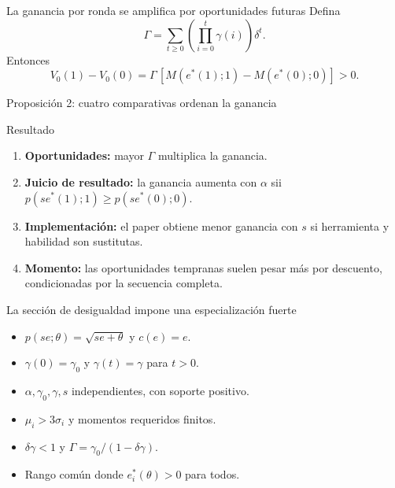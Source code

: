 \documentclass[aspectratio=169,11pt]{beamer}
\begin{document}
\begin{frame}{La ganancia por ronda se amplifica por oportunidades futuras}
  Defina
  \[
  \Gamma=\sum_{t\ge0}\left(\prod_{i=0}^{t}\gamma(i)\right)\delta^t.
  \]
  Entonces
  \[
  V_0(1)-V_0(0)
  =\Gamma\,[M(e^*(1);1)-M(e^*(0);0)]>0.
  \]
\end{frame}

\begin{frame}{Proposición 2: cuatro comparativas ordenan la ganancia}
  \small
  \begin{block}{Resultado}
  \begin{enumerate}
    \item \textbf{Oportunidades:} mayor $\Gamma$ multiplica la ganancia.
    \item \textbf{Juicio de resultado:} la ganancia aumenta con $\alpha$ sii
      $p(se^*(1);1)\ge p(se^*(0);0)$.
    \item \textbf{Implementación:} el paper obtiene menor ganancia con $s$ si
      herramienta y habilidad son sustitutas.
    \item \textbf{Momento:} las oportunidades tempranas suelen pesar más por
      descuento, condicionadas por la secuencia completa.
  \end{enumerate}
  \end{block}
\end{frame}

\begin{frame}{La sección de desigualdad impone una especialización fuerte}
  \begin{itemize}
    \item $p(se;\theta)=\sqrt{se+\theta}$ y $c(e)=e$.
    \item $\gamma(0)=\gamma_0$ y $\gamma(t)=\gamma$ para $t>0$.
    \item $\alpha,\gamma_0,\gamma,s$ independientes, con soporte positivo.
    \item $\mu_i>3\sigma_i$ y momentos requeridos finitos.
    \item $\delta\gamma<1$ y $\Gamma=\gamma_0/(1-\delta\gamma)$.
    \item Rango común donde $e_i^*(\theta)>0$ para todos.
  \end{itemize}
\end{frame}
\end{document}
